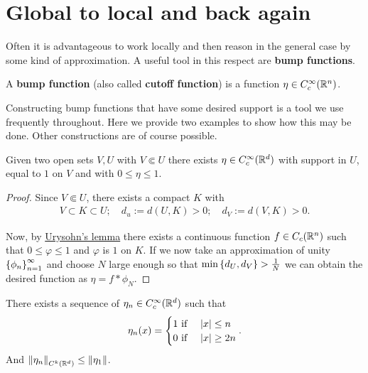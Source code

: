 \documentclass[
    a4paper,
    DIV=14,
    abstract=true,
    numbers=noenddot
]{scrartcl}
\begin{document}
\section{Global to local and back again}\label{local to global}
Often it is advantageous to work locally and then reason in the general case by some kind of approximation. A useful tool in this respect are \textbf{bump functions}.
\begin{definition}\label{bump def}
	A \textbf{bump function} (also called \textbf{cutoff function}) is a function $\eta \in C_c^\infty(\mathbb{R}^n)$.
\end{definition}
Constructing bump functions that have some desired support is a tool we use frequently throughout. Here we provide two examples to show how this may be done. Other constructions are of course possible.
\begin{example}\label{bump example2}
	Given two open sets $V,U$ with  $V \Subset U$ there exists $\eta \in C_c^\infty(\mathbb{R}^d)$ with support in $U$, equal to  $1$ on  $V$ and with $0\leq \eta \leq 1$.
\end{example}
\begin{proof}
	Since $V \Subset U$, there exists a compact  $K$ with
	\begin{align*}
		V \subset K \subset U;\quad d_u:=d(U,K)>0; \quad d_V:=d(V,K)>0.
	\end{align*}

	Now, by \href{https://en.wikipedia.org/wiki/Urysohn%27s_lemma#:~:text=for%20any%20two-,non%2Dempty,-closed%20disjoint%20subsets}{Urysohn's lemma} there exists a continuous function  $f \in C_c(\mathbb{R}^n)$ such that $0\leq\varphi \leq 1$ and $\varphi$ is $1$ on  $K$.  If we now take an approximation of unity $\left\{\phi_n\right\}_{n=1}^\infty $  and choose $N$ large enough so that $\min \left\{d_U,d_V\right\} > \frac{1}{N}$ we can obtain the desired function as $ \eta=f*\phi_{N}$.
\end{proof}
\begin{example}
	There exists a sequence of $\eta_n \in C_c^\infty(\mathbb{R}^d)$ such  that
	\begin{align*}
		\eta_n(x) =\begin{cases}
			           1 \text{ if } & {\left| x \right|}\leq n  \\
			           0 \text{ if } & {\left| x \right|}\geq 2n \\
		           \end{cases}.
	\end{align*}
	And $\left\lVert \eta_n \right\rVert_{C^k(\mathbb{R}^d)} \leq \left\lVert \eta_1 \right\rVert $.
\end{example}
\end{document}
